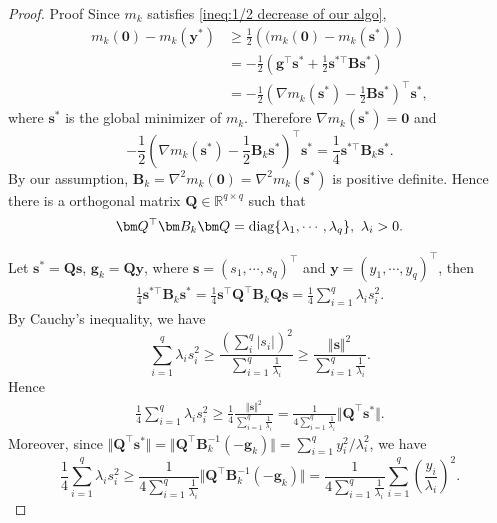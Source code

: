 \documentclass[colorlinks=true, linkcolor=blue, citecolor=blue, urlcolor=blue]{article}
\theoremstyle{plain}
\theoremstyle{definition}
\theoremstyle{remark}
\begin{document}
\begin{proof}{Proof}
    Since $m_k$ satisfies \eqref{ineq:1/2 decrease of our algo}, \begin{equation*}
    \begin{aligned}
        m_k(\bm 0)-m_k(\bm y^*)
        &\geq\frac{1}{2}\left((m_k(\bm 0)-m_k(\bm s^*)\right)\\
        &=-\frac{1}{2}\left(\bm g^\top \bm s^*+\frac{1}{2}\bm s^{*\top}\bm B\bm s^*\right)\\
        &=-\frac{1}{2}\left(\nabla m_k(\bm s^*)-\frac{1}{2}\bm B\bm s^*\right)^\top\bm s^*,
    \end{aligned}
    \end{equation*}
where $\bm s^*$ is the global minimizer of $m_k$. Therefore $\nabla m_k(\bm s^*)=\bm 0$ and 
\begin{equation*}
        -\frac{1}{2}\left(\nabla m_k(\bm s^*)-\frac{1}{2}\bm B_k\bm s^*\right)^\top\bm s^*=\frac{1}{4}\bm s^{*\top}\bm B_k\bm s^*.
\end{equation*}
By our assumption, $\bm B_k=\nabla^2m_k(\bm 0)=\nabla^2m_k(\bm s^*)$ is positive definite. Hence there is a orthogonal matrix $\bm Q\in\mathbb{R}^{q\times q}$ such that
\begin{equation*}
    \bm Q^\top \bm B_k\bm Q={\rm diag}\{\lambda_1,\cdots,\lambda_q\},\ \lambda_i>0.
\end{equation*}

Let $\bm s^*=\bm Q \bm s$, $\bm g_k=\bm Q\bm y$, where $\bm s=(s_1,\cdots,s_q)^\top$ and $\bm y=(y_1,\cdots,y_q)^\top$, then 
\begin{equation*}
\begin{aligned}
     \frac{1}{4}\bm s^{*\top}\bm B_k\bm s^*=\frac{1}{4}\bm s^\top\bm Q^\top\bm B_k\bm Q\bm s=\frac{1}{4}\sum_{i=1}^{q}\lambda_i s_i^2.
\end{aligned}
\end{equation*}
By Cauchy's inequality, we have 
\begin{equation*}
    \sum_{i=1}^{q}\lambda_i s_i^2\geq \frac{\left(\sum_i^q| s_i|\right)^2}{\sum_{i=1}^q\frac{1}{\lambda_i}}\geq\frac{\Vert\bm s\Vert^2}{\sum_{i=1}^q\frac{1}{\lambda_i}}.
\end{equation*}
Hence 
\begin{equation*}
\begin{aligned}
     \frac{1}{4}\sum_{i=1}^{q}\lambda_i s_i^2\geq\frac{1}{4}\frac{\Vert\bm s\Vert^2}{\sum_{i=1}^q\frac{1}{\lambda_i}}=\frac{1}{4\sum_{i=1}^q\frac{1}{\lambda_i}}\Vert\bm Q^\top \bm s^*\Vert.
\end{aligned}
\end{equation*} 
Moreover, since $\Vert \bm Q^\top\bm s^*\Vert=\Vert \bm Q^\top\bm B_k^{-1}(-\bm g_k)\Vert=\sum_{i=1}^q y_i^2/\lambda_i^2$, we have
\begin{equation*}
    \frac{1}{4}\sum_{i=1}^{q}\lambda_i s_i^2\geq\frac{1}{4\sum_{i=1}^q\frac{1}{\lambda_i}}\Vert\bm Q^\top \bm B_k^{-1}\left(-\bm g_k\right)\Vert=\frac{1}{4\sum_{i=1}^q\frac{1}{\lambda_i}}\sum_{i=1}^q \left(\frac{y_i}{\lambda_i}\right)^2.
\end{equation*}


\end{proof}
\end{document}
